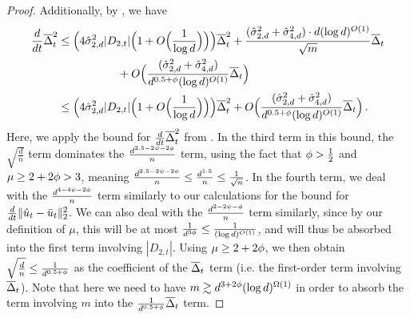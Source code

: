 \begin{proof}
Additionally, by , we have
\begin{align}
\frac{d}{dt} \overline{\Delta}_t^2 
& \leq \Big(4 \hat{\sigma}_{2, d}^2 |D_{2, t}| \Big(1 + O\Big(\frac{1}{\log d}\Big)\Big)\Big) \overline{\Delta}_t^2 + \frac{(\hat{\sigma}_{2, d}^2 + \hat{\sigma}_{4, d}^2) \cdot d (\log d)^{O(1)}}{\sqrt{m}} \overline{\Delta}_t \\
& \,\,\,\,\,\,\,\,\,\,\,\,\,\,\,\,\,\,\,\,\,\,\,\,\,\,\,\,\,\,\,\, + O\Big(\frac{(\hat{\sigma}_{2, d}^2 + \hat{\sigma}_{4, d}^2)}{d^{0.5 + \phi} (\log d)^{O(1)}} \overline{\Delta}_t\Big) \\
& \leq \Big(4 \hat{\sigma}_{2, d}^2 |D_{2, t}| \Big(1 + O\Big(\frac{1}{\log d}\Big)\Big)\Big) \overline{\Delta}_t^2 + O\Big(\frac{(\hat{\sigma}_{2, d}^2 + \hat{\sigma}_{4, d}^2)}{d^{0.5 + \phi} (\log d)^{O(1)}} \overline{\Delta}_t\Big) \,.
\end{align}
Here, we apply the bound for $\frac{d}{dt} \overline{\Delta}_t^2$ from . In the third term in this bound, the $\sqrt{\frac{d}{n}}$ term dominates the $\frac{d^{2.5 - 2\psi - 2\phi}}{n}$ term, using the fact that $\phi > \frac{1}{2}$ and $\mu \geq 2 + 2\phi > 3$, meaning $\frac{d^{2.5 - 2\psi - 2\phi}}{n} \leq \frac{d^{1.5}}{n} \leq \frac{1}{\sqrt{n}}$. In the fourth term, we deal with the $\frac{d^{4 - 4\psi - 2\phi}}{n}$ term similarly to our calculations for the bound for $\frac{d}{dt} \|\hat{u}_t - \bar{u}_t\|_2^2$. We can also deal with the $\frac{d^{2 - 2\psi - \phi}}{n}$ term similarly, since by our definition of $\mu$, this will be at most $\frac{1}{d^{3 \phi}} \leq \frac{1}{(\log d)^{O(1)}}$, and will thus be absorbed into the first term involving $|D_{2, t}|$. Using $\mu \geq 2 + 2\phi$, we then obtain $\sqrt{\frac{d}{n}} \leq \frac{1}{d^{0.5 + \phi}}$ as the coefficient of the $\overline{\Delta}_t$ term (i.e. the first-order term involving $\overline{\Delta}_t$). Note that here we need to have $m \gtrsim d^{3 + 2 \phi} (\log d)^{\Omega(1)}$ in order to absorb the term involving $m$ into the $\frac{1}{d^{0.5 + \phi}} \overline{\Delta}_t$ term.


\end{proof}
